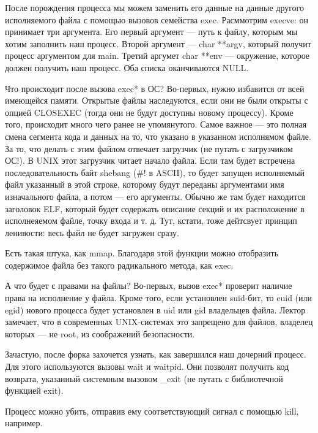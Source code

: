 \documentclass[main]{subfiles}
\begin{document}
После порождения процесса мы можем заменить его данные на данные другого
исполняемого файла с помощью вызовов семейства exec. Расммотрим execve:
он принимает три аргумента.
Его первый аргумент --- путь к файлу, которым мы хотим заполнить наш
процесс. Второй аргумент --- char **argv, который получит процесс аргументом
для main. Третий аргумет char **env --- окружение, которое должен получить
наш процесс. Оба списка оканчиваются NULL.

Что происходит после вызова exec* в ОС? Во-первых, нужно избавится от
всей имеющейся памяти. Открытые файлы наследуются, если они не были
открыты с опцией CLOSEXEC (тогда они не будут доступны новому процессу).
Кроме того, происходит много чего ранее не упомянутого.
Самое важное --- это полная смена сегмента кода и данных на то, что
указано в указанном исполнямом файле. За то, что делать с этим файлом
отвечает загрузчик (не путать с загрузчиком ОС!). В UNIX этот загрузчик читает
начало файла. Если там будет встречена последовательность байт shebang
(\#! в ASCII), то будет запущен исполняемый файл указанный в этой строке,
которому будут переданы аргументами имя изначального файла, а потом --- его
аргументы. Обычно же там будет находится заголовок ELF, который будет содержать
описание секций и их расположение в исполнеяемом файле, точку входа и т. д.
Тут, кстати, тоже дейтсвует принцип ленивости: весь файл не будет загружен сразу.

Есть такая штука, как mmap. Благодаря этой функции можно отобразить содержимое файла
без такого радикального метода, как exec.

А что будет с правами на файлы? Во-первых, вызов exec* проверит наличие права
на исполнение у файла. Кроме того, если установлен suid-бит, то euid (или egid)
нового процесса будет установлен в uid или gid владельцев файла.
Лектор замечает, что в современных UNIX-системах это запрещено для файлов,
владелец которых --- не root, из соображений безопасности.

Зачастую, после форка захочется узнать, как завершился наш дочерний
процесс. Для этого используются вызовы wait и waitpid.
Они позволят получить код возврата, указанный системным вызовом \_exit
(не путать с библиотечной функцией exit).

Процесс можно убить, отправив ему соответствующий сигнал с помощью
kill, например.
\end{document}
